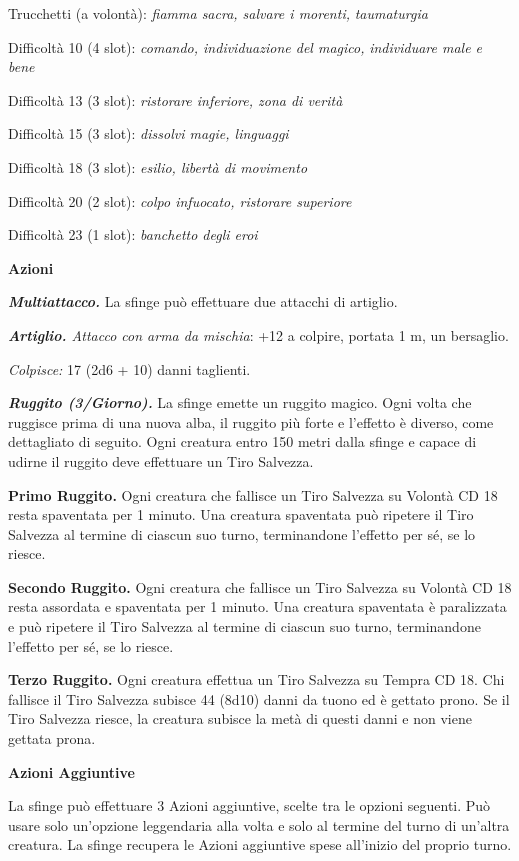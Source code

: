 \begin{multicols}{2}
Trucchetti (a volontà): \emph{fiamma sacra, salvare i morenti,} \emph{taumaturgia}

Difficoltà 10 (4 slot): \emph{comando, individuazione del magico,} \emph{individuare male e bene}

Difficoltà 13 (3 slot): \emph{ristorare inferiore, zona di verità}

Difficoltà 15 (3 slot): \emph{dissolvi magie, linguaggi}

Difficoltà 18 (3 slot): \emph{esilio, libertà di movimento}

Difficoltà 20 (2 slot): \emph{colpo infuocato, ristorare superiore}

Difficoltà 23 (1 slot): \emph{banchetto degli eroi}

\textbf{Azioni}

\emph{\textbf{Multiattacco.}} La sfinge può effettuare due attacchi di artiglio.

\emph{\textbf{Artiglio.} Attacco con arma da mischia}: +12 a colpire, portata 1 m, un bersaglio.

\emph{Colpisce:} 17 (2d6 + 10) danni taglienti.

\emph{\textbf{Ruggito (3/Giorno).}} La sfinge emette un ruggito magico. Ogni volta che ruggisce prima di una nuova alba, il ruggito più forte e l'effetto è diverso, come dettagliato di seguito. Ogni creatura entro 150 metri dalla sfinge e capace di udirne il ruggito deve effettuare un Tiro Salvezza.

\textbf{Primo Ruggito.} Ogni creatura che fallisce un Tiro Salvezza su Volontà CD 18 resta spaventata per 1 minuto. Una creatura spaventata può ripetere il Tiro Salvezza al termine di ciascun suo turno, terminandone l'effetto per sé, se lo riesce.

\textbf{Secondo Ruggito.} Ogni creatura che fallisce un Tiro Salvezza su Volontà CD 18 resta assordata e spaventata per 1 minuto. Una creatura spaventata è paralizzata e può ripetere il Tiro Salvezza al termine di ciascun suo turno, terminandone l'effetto per sé, se lo riesce.

\textbf{Terzo Ruggito.} Ogni creatura effettua un Tiro Salvezza su Tempra CD 18. Chi fallisce il Tiro Salvezza subisce 44 (8d10) danni da tuono ed è gettato prono. Se il Tiro Salvezza riesce, la creatura subisce la metà di questi danni e non viene gettata prona. 

\textbf{Azioni Aggiuntive}

La sfinge può effettuare 3 Azioni aggiuntive, scelte tra le opzioni seguenti. Può usare solo un'opzione leggendaria alla volta e solo al termine del turno di un'altra creatura. La sfinge recupera le Azioni aggiuntive spese all'inizio del proprio turno.


\end{multicols}
